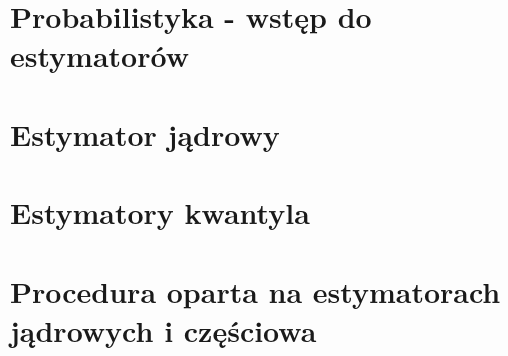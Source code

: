 \section{Probabilistyka - wstęp do estymatorów}
\section{Estymator jądrowy}
\section{Estymatory kwantyla}
\section{Procedura oparta na estymatorach jądrowych i częściowa}


